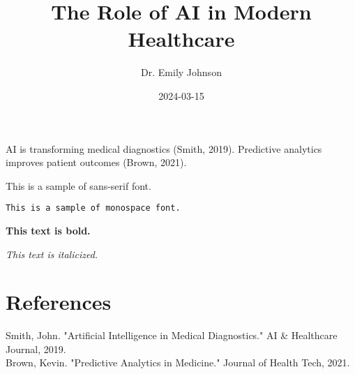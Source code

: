\documentclass{article}
\title{The Role of AI in Modern Healthcare}
\author{Dr. Emily Johnson}
\date{2024-03-15}
\begin{document}
\maketitle

AI is transforming medical diagnostics (Smith, 2019). Predictive analytics improves patient outcomes (Brown, 2021). 

\textsf{This is a sample of sans-serif font.}

\texttt{This is a sample of monospace font.}

\textbf{This text is bold.}

\textit{This text is italicized.}

\section{References}
Smith, John. "Artificial Intelligence in Medical Diagnostics." AI \& Healthcare Journal, 2019.\\
Brown, Kevin. "Predictive Analytics in Medicine." Journal of Health Tech, 2021.
\end{document}
